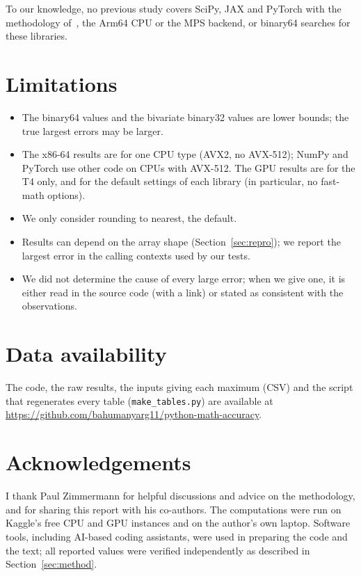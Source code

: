 \documentclass[11pt,a4paper]{article}
\begin{document}
To our knowledge, no previous study covers SciPy, JAX and PyTorch with the methodology of~\cite{GIMOZ2026}, the Arm64 CPU or the MPS backend, or binary64 searches for these libraries.

\section{Limitations}
\begin{itemize}
\item The binary64 values and the bivariate binary32 values are lower bounds; the true largest errors may be larger.
\item The x86-64 results are for one CPU type (AVX2, no AVX-512); NumPy and PyTorch use other code on CPUs with AVX-512. The GPU results are for the T4 only, and for the default settings of each library (in particular, no fast-math options).
\item We only consider rounding to nearest, the default.
\item Results can depend on the array shape (Section~\ref{sec:repro}); we report the largest error in the calling contexts used by our tests.
\item We did not determine the cause of every large error; when we give one, it is either read in the source code (with a link) or stated as consistent with the observations.
\end{itemize}

\section*{Data availability}
The code, the raw results, the inputs giving each maximum (CSV) and the script that regenerates every table (\texttt{make\_tables.py}) are available at \url{https://github.com/bahumanyarg11/python-math-accuracy}.

\section*{Acknowledgements}
I thank Paul Zimmermann for helpful discussions and advice on the methodology, and for sharing this report with his co-authors. The computations were run on Kaggle's free CPU and GPU instances and on the author's own laptop. Software tools, including AI-based coding assistants, were used in preparing the code and the text; all reported values were verified independently as described in Section~\ref{sec:method}.



\end{document}
